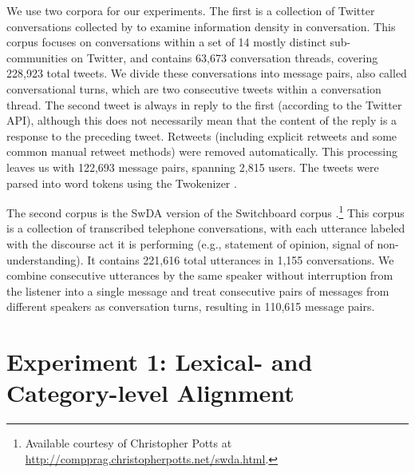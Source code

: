 \documentclass[11pt]{article}
\begin{document}
We use two corpora for our experiments. The first is a collection of Twitter conversations collected by \cite{DoyleFrank2015CMCL} to examine information density in conversation. This corpus focuses on conversations within a set of 14 mostly distinct sub-communities on Twitter, and contains 63,673 conversation threads, covering 228,923 total tweets.  We divide these conversations into message pairs, also called conversational turns, which are two consecutive tweets within a conversation thread.  The second tweet is always in reply to the first (according to the Twitter API), although this does not necessarily mean that the content of the reply is a response to the preceding tweet. Retweets (including explicit retweets and some common manual retweet methods) were removed automatically. This processing leaves us with 122,693 message pairs, spanning 2,815 users.  The tweets were parsed into word tokens using the Twokenizer \cite{OwoputiEtAl2013}.

The second corpus is the SwDA version of the Switchboard corpus \cite{godfrey1992switchboard,jurafsky1997switchboard}.\footnote{Available courtesy of Christopher Potts at \url{http://compprag.christopherpotts.net/swda.html}.} This corpus is a collection of transcribed telephone conversations, with each utterance labeled with the discourse act it is performing (e.g., statement of opinion, signal of non-understanding).  It contains 221,616 total utterances in 1,155 conversations.  We combine consecutive utterances by the same speaker without interruption from the listener into a single message and treat consecutive pairs of messages from different speakers as conversation turns, resulting in 110,615 message pairs.

\section{Experiment 1: Lexical- and Category-level Alignment}
%

\end{document}
